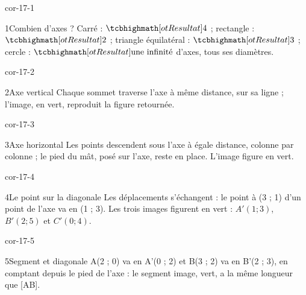 \clearpage\pagestyle{otMain}\setlength{\otBlocEspacement}{2.5mm}\fontsize{11}{15}\selectfont{}
\begin{blocLivre}{cor-17-1}\begin{corrige}{1}{Combien d’axes ?}
Carré : $\res4$ ; rectangle : $\res2$ ; triangle équilatéral : $\res3$ ; cercle : $\res{\text{une infinité}}$ d’axes, tous ses diamètres.
\label{fig-cor-17-1}
\end{corrige}\end{blocLivre}
\begin{blocLivre}{cor-17-2}\begin{corrige}{2}{Axe vertical}
Chaque sommet traverse l’axe à même distance, sur sa ligne ; l’image, en vert, reproduit la figure retournée.
\label{fig-cor-17-2}
\end{corrige}\end{blocLivre}
\begin{blocLivre}{cor-17-3}\begin{corrige}{3}{Axe horizontal}
Les points descendent sous l’axe à égale distance, colonne par colonne ; le pied du mât, posé sur l’axe, reste en place. L’image figure en vert.
\label{fig-cor-17-3}
\end{corrige}\end{blocLivre}
\begin{blocLivre}{cor-17-4}\begin{corrige}{4}{Le point sur la diagonale}
Les déplacements s’échangent : le point à (3 ; 1) d’un point de l’axe va en (1 ; 3). Les trois images figurent en vert : $A'(1 ; 3)$, $B'(2 ; 5)$ et $C'(0 ; 4)$.
\label{fig-cor-17-4}
\end{corrige}\end{blocLivre}
\begin{blocLivre}{cor-17-5}\begin{corrige}{5}{Segment et diagonale}
A(2 ; 0) va en A'(0 ; 2) et B(3 ; 2) va en B'(2 ; 3), en comptant depuis le pied de l’axe : le segment image, vert, a la même longueur que [AB].
\label{fig-cor-17-5}
\end{corrige}\end{blocLivre}
